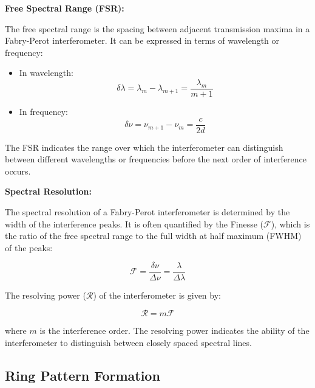 \documentclass[
  a4paper,
]{book}
\begin{document}
\begin{tcolorbox}[enhanced jigsaw, coltitle=black, title=\textcolor{quarto-callout-note-color}{\faInfo}\hspace{0.5em}{Free Spectral Range and Spectral Resolution}, colframe=quarto-callout-note-color-frame, toprule=.15mm, opacitybacktitle=0.6, left=2mm, opacityback=0, breakable, toptitle=1mm, bottomtitle=1mm, leftrule=.75mm, arc=.35mm, titlerule=0mm, colbacktitle=quarto-callout-note-color!10!white, rightrule=.15mm, bottomrule=.15mm, colback=white]

\textbf{Free Spectral Range (FSR):}

The free spectral range is the spacing between adjacent transmission
maxima in a Fabry-Perot interferometer. It can be expressed in terms of
wavelength or frequency:

\begin{itemize}
\item
  In wavelength: \[
  \delta \lambda = \lambda_{m} - \lambda_{m+1} = \frac{\lambda_m}{m+1}
  \]
\item
  In frequency: \[
  \delta \nu = \nu_{m+1} - \nu_m = \frac{c}{2d}
  \]
\end{itemize}

The FSR indicates the range over which the interferometer can
distinguish between different wavelengths or frequencies before the next
order of interference occurs.

\textbf{Spectral Resolution:}

The spectral resolution of a Fabry-Perot interferometer is determined by
the width of the interference peaks. It is often quantified by the
Finesse (\(\mathcal{F}\)), which is the ratio of the free spectral range
to the full width at half maximum (FWHM) of the peaks:

\[
\mathcal{F} = \frac{\delta \nu}{\Delta \nu} = \frac{\lambda}{\Delta \lambda}
\]

The resolving power (\(\mathcal{R}\)) of the interferometer is given by:

\[
\mathcal{R} = m \mathcal{F}
\]

where \(m\) is the interference order. The resolving power indicates the
ability of the interferometer to distinguish between closely spaced
spectral lines.

\end{tcolorbox}

\subsection{Ring Pattern Formation}\label{ring-pattern-formation}
\end{document}
